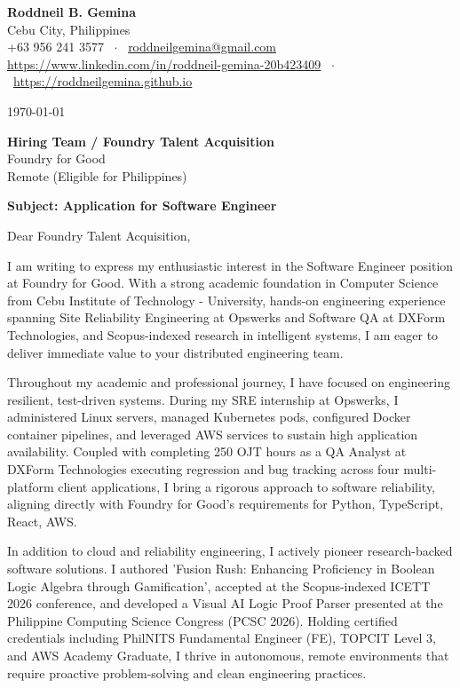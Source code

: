\documentclass[letterpaper,11pt]{article}
\begin{document}
\textbf{Roddneil B. Gemina} \\
Cebu City, Philippines \\
+63 956 241 3577 \ $\cdot$ \ \href{mailto:roddneilgemina@gmail.com}{roddneilgemina@gmail.com} \\
\href{https://www.linkedin.com/in/roddneil-gemina-20b423409}{https://www.linkedin.com/in/roddneil-gemina-20b423409} \ $\cdot$ \ \href{https://roddneilgemina.github.io}{https://roddneilgemina.github.io}

\vspace{12pt}
\today

\vspace{8pt}
\textbf{Hiring Team / Foundry Talent Acquisition} \\
Foundry for Good \\
Remote (Eligible for Philippines)

\vspace{8pt}
\textbf{Subject: Application for Software Engineer}

\vspace{4pt}
Dear Foundry Talent Acquisition,

I am writing to express my enthusiastic interest in the Software Engineer position at Foundry for Good. With a strong academic foundation in Computer Science from Cebu Institute of Technology - University, hands-on engineering experience spanning Site Reliability Engineering at Opswerks and Software QA at DXForm Technologies, and Scopus-indexed research in intelligent systems, I am eager to deliver immediate value to your distributed engineering team.

Throughout my academic and professional journey, I have focused on engineering resilient, test-driven systems. During my SRE internship at Opswerks, I administered Linux servers, managed Kubernetes pods, configured Docker container pipelines, and leveraged AWS services to sustain high application availability. Coupled with completing 250 OJT hours as a QA Analyst at DXForm Technologies executing regression and bug tracking across four multi-platform client applications, I bring a rigorous approach to software reliability, aligning directly with Foundry for Good's requirements for Python, TypeScript, React, AWS.

In addition to cloud and reliability engineering, I actively pioneer research-backed software solutions. I authored 'Fusion Rush: Enhancing Proficiency in Boolean Logic Algebra through Gamification', accepted at the Scopus-indexed ICETT 2026 conference, and developed a Visual AI Logic Proof Parser presented at the Philippine Computing Science Congress (PCSC 2026). Holding certified credentials including PhilNITS Fundamental Engineer (FE), TOPCIT Level 3, and AWS Academy Graduate, I thrive in autonomous, remote environments that require proactive problem-solving and clean engineering practices.
\end{document}
